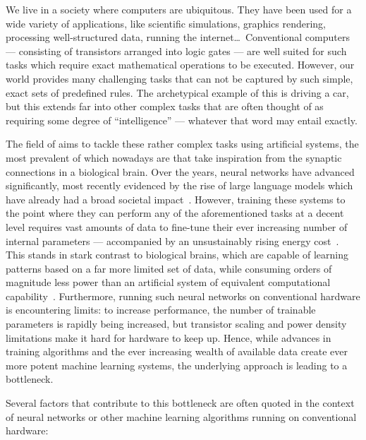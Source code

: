 We live in a society where computers are ubiquitous.
They have been used for a wide variety of applications, like scientific simulations, graphics rendering, processing well-structured data, running the internet\dots\,
Conventional computers --- consisting of transistors arranged into logic gates --- are well suited for such tasks which require exact mathematical operations to be executed.
However, our world provides many challenging tasks that can not be captured by such simple, exact sets of predefined rules.
The archetypical example of this is driving a car, but this extends far into other complex tasks that are often thought of as requiring some degree of ``intelligence'' --- whatever that word may entail exactly. \par
The field of  aims to tackle these rather complex tasks using artificial systems, the most prevalent of which nowadays are  that take inspiration from the synaptic connections in a biological brain.
Over the years, neural networks have advanced significantly, most recently evidenced by the rise of large language models which have already had a broad societal impact~\cite{ImprovingLanguageGPT,GPT-4}.
However, training these systems to the point where they can perform any of the aforementioned tasks at a decent level requires vast amounts of data to fine-tune their ever increasing number of internal parameters --- accompanied by an unsustainably rising energy cost~\cite{QuantumNeuromorphicOpportunities,BLOOM_CarbonFootprint_176Bparam}.
This stands in stark contrast to biological brains, which are capable of learning patterns based on a far more limited set of data, while consuming orders of magnitude less power than an artificial system of equivalent computational capability~\cite{NeuromorphicSpintronics}.
Furthermore, running such neural networks on conventional hardware is encountering limits: to increase performance, the number of trainable parameters is rapidly being increased, but transistor scaling and power density limitations make it hard for hardware to keep up. %
Hence, while advances in training algorithms and the ever increasing wealth of available data create ever more potent machine learning systems, the underlying approach is leading to a bottleneck. \par
Several factors that contribute to this bottleneck are often quoted in the context of neural networks or other machine learning algorithms running on conventional hardware:
